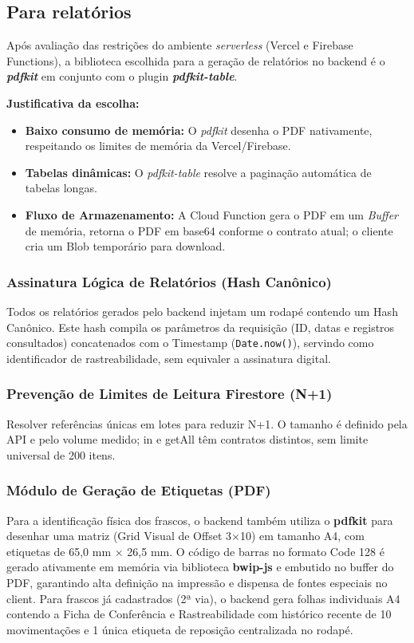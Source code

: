 \subsection{Para relatórios}
Após avaliação das restrições do ambiente \textit{serverless} (Vercel e Firebase Functions), a biblioteca escolhida para a geração de relatórios no backend é o \textbf{\textit{pdfkit}} em conjunto com o plugin \textbf{\textit{pdfkit-table}}.

\textbf{Justificativa da escolha:}
\begin{itemize}
    \item \textbf{Baixo consumo de memória:} O \textit{pdfkit} desenha o PDF nativamente, respeitando os limites de memória da Vercel/Firebase.
    \item \textbf{Tabelas dinâmicas:} O \textit{pdfkit-table} resolve a paginação automática de tabelas longas.
    \item \textbf{Fluxo de Armazenamento:} A Cloud Function gera o PDF em um \textit{Buffer} de memória, retorna o PDF em base64 conforme o contrato atual; o cliente cria um Blob temporário para download.
\end{itemize}

\subsubsection{Assinatura Lógica de Relatórios (Hash Canônico)}
Todos os relatórios gerados pelo backend injetam um rodapé contendo um Hash Canônico. Este hash compila os parâmetros da requisição (ID, datas e registros consultados) concatenados com o Timestamp (\texttt{Date.now()}), servindo como identificador de rastreabilidade, sem equivaler a assinatura digital.

\subsubsection{Prevenção de Limites de Leitura Firestore (N+1)}
Resolver referências únicas em lotes para reduzir N+1. O tamanho é definido pela API e pelo volume medido; in e getAll têm contratos distintos, sem limite universal de 200 itens.

\subsubsection{Módulo de Geração de Etiquetas (PDF)}
Para a identificação física dos frascos, o backend também utiliza o \textbf{pdfkit} para desenhar uma matriz (Grid Visual de Offset 3×10) em tamanho A4, com etiquetas de 65,0 mm × 26,5 mm. O código de barras no formato Code 128 é gerado ativamente em memória via biblioteca \textbf{bwip-js} e embutido no buffer do PDF, garantindo alta definição na impressão e dispensa de fontes especiais no client. Para frascos já cadastrados (2ª via), o backend gera folhas individuais A4 contendo a Ficha de Conferência e Rastreabilidade com histórico recente de 10 movimentações e 1 única etiqueta de reposição centralizada no rodapé.


